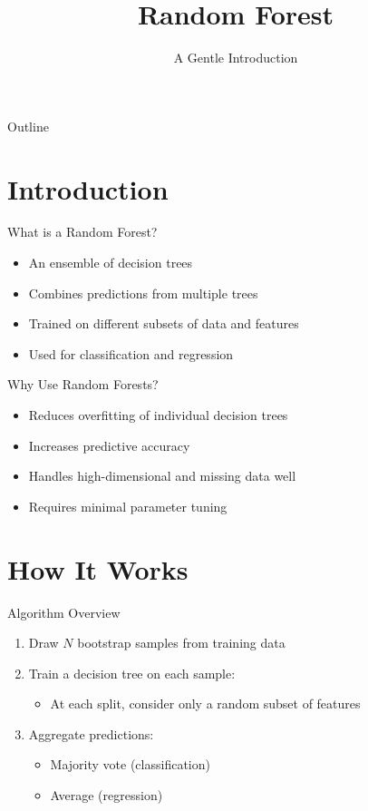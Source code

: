 \documentclass{beamer}
\title{Random Forest}
\subtitle{A Gentle Introduction}
\date{}
\begin{document}
{
\begin{frame}
    \titlepage
\end{frame}
}

\begin{frame}{Outline}
    \tableofcontents
\end{frame}

\section{Introduction}

\begin{frame}{What is a Random Forest?}
\begin{itemize}
    \item An ensemble of decision trees
    \item Combines predictions from multiple trees
    \item Trained on different subsets of data and features
    \item Used for classification and regression
\end{itemize}
\end{frame}

\begin{frame}{Why Use Random Forests?}
\begin{itemize}
    \item Reduces overfitting of individual decision trees
    \item Increases predictive accuracy
    \item Handles high-dimensional and missing data well
    \item Requires minimal parameter tuning
\end{itemize}
\end{frame}

\section{How It Works}

\begin{frame}{Algorithm Overview}
\begin{enumerate}
    \item Draw $N$ bootstrap samples from training data
    \item Train a decision tree on each sample:
    \begin{itemize}
        \item At each split, consider only a random subset of features
    \end{itemize}
    \item Aggregate predictions:
    \begin{itemize}
        \item Majority vote (classification)
        \item Average (regression)
    \end{itemize}
\end{enumerate}
\end{frame}
\end{document}
